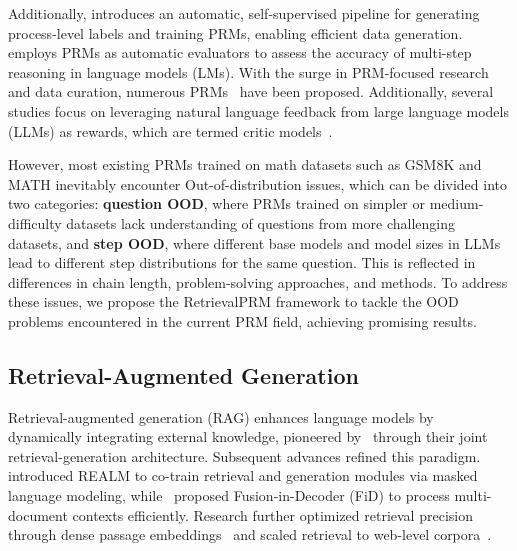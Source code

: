 Additionally, \citet{wang2024math} introduces an automatic, self-supervised pipeline for generating process-level labels and training PRMs, enabling efficient data generation. \citet{xia2025evaluatingmathematicalreasoningaccuracy} employs PRMs as automatic evaluators to assess the accuracy of multi-step reasoning in language models (LMs). With the surge in PRM-focused research and data curation, numerous PRMs~\cite{skyworkopeno12024,xiong2024rlhflowmath,sun2024easytohardgeneralizationscalablealignment,gao2024llmcriticshelpcatch,wang2024openropensourceframework} have been proposed. Additionally, several studies focus on leveraging natural language feedback from large language models (LLMs) as rewards, which are termed critic models~\cite{mcaleese2024llmcriticshelpcatch,zhang2024generativeverifiersrewardmodeling,gao2024llmcriticshelpcatch}.

However, most existing PRMs trained on math datasets such as GSM8K and MATH inevitably encounter Out-of-distribution issues, which can be divided into two categories: \textbf{question OOD}, where PRMs trained on simpler or medium-difficulty datasets lack understanding of questions from more challenging datasets, and \textbf{step OOD}, where different base models and model sizes in LLMs lead to different step distributions for the same question. This is reflected in differences in chain length, problem-solving approaches, and methods. To address these issues, we propose the RetrievalPRM framework to tackle the OOD problems encountered in the current PRM field, achieving promising results.


\subsection{Retrieval-Augmented Generation}

Retrieval-augmented generation (RAG) enhances language models by dynamically integrating external knowledge, pioneered by~\cite{lewis2021retrievalaugmentedgenerationknowledgeintensivenlp} through their joint retrieval-generation architecture. Subsequent advances refined this paradigm. \citet{guu2020realmretrievalaugmentedlanguagemodel} introduced REALM to co-train retrieval and generation modules via masked language modeling, while~\citet{izacard2021leveragingpassageretrievalgenerative} proposed Fusion-in-Decoder (FiD) to process multi-document contexts efficiently. Research further optimized retrieval precision through dense passage embeddings~\cite{karpukhin2020densepassageretrievalopendomain} and scaled retrieval to web-level corpora~\cite{borgeaud2022improvinglanguagemodelsretrieving}. 